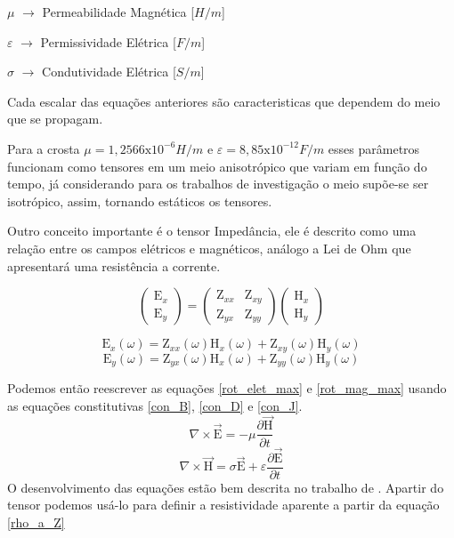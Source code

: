 	    $\mu$ $\rightarrow$ Permeabilidade Magnética [$H/m$]
	    
	    $\varepsilon$ $\rightarrow$ Permissividade Elétrica [$F/m$]
	    
	    $\sigma$ $\rightarrow$ Condutividade Elétrica [$S/m$]
	    
	    Cada escalar das equações anteriores são caracteristicas que dependem do meio 
	    que se propagam.
	    
	    Para a crosta $\mu = 1,2566\textrm{x}10^{-6} H/m$ e $\varepsilon = 8,85
	    \textrm{x}10^{-12} F/m$ esses parâmetros funcionam como tensores em um meio
	    anisotrópico que variam em função do tempo, já considerando para os 
	    trabalhos de investigação o meio supõe-se ser isotrópico, assim, 
	    tornando estáticos os tensores.
	    
	    Outro conceito importante é o tensor Impedância, ele é descrito como uma
	    relação entre os campos elétricos e magnéticos, análogo a Lei de Ohm \cite{eletromag8hayt}
	    que apresentará uma resistência a corrente.
	    
	    \begin{equation}
		\left (\begin{array}{c}
		 \textrm{E}_x\\
		 \textrm{E}_y
		\end{array}\right)
		=
		\left (\begin{array}{cc}
		 \textrm{Z}_{xx} & \textrm{Z}_{xy}\\
		 \textrm{Z}_{yx} & \textrm{Z}_{yy}
		\end{array}\right) \left (\begin{array}{c}
		 \textrm{H}_x\\
		 \textrm{H}_y
		\end{array}\right)
	    \end{equation}
	    
	    \begin{equation}
	     \textrm{E}_x (\omega)=\textrm{Z}_{xx}(\omega) \textrm{H}_{x}(\omega) + \textrm{Z}_{xy}(\omega) \textrm{H}_{y}(\omega)
	    \end{equation}
	    \begin{equation}
	     \textrm{E}_y (\omega)=\textrm{Z}_{yx}(\omega) \textrm{H}_{x}(\omega) + \textrm{Z}_{yy}(\omega) \textrm{H}_{y}(\omega)
	    \end{equation}  
	    
	    Podemos então reescrever as equações \ref{rot_elet_max}
	    e \ref{rot_mag_max} usando as equações constitutivas \ref{con_B}, \ref{con_D}
	    e \ref{con_J}.
	    \begin{equation}
	     \nabla \times \vec{\textrm{E}} = - \mu \frac{\partial \vec{\textrm{H}}}{\partial t} 
	    \end{equation}
	    \begin{equation}
	     \nabla \times \vec{\textrm{H}} = \sigma \vec{\textrm{E}} + \varepsilon \frac{\partial \vec{\textrm{E}}}{\partial t} 
	    \end{equation}
	    O desenvolvimento das equações estão bem descrita no trabalho de \citeauthor{didana2010}\citeyearpar{didana2010}.
	    Apartir do tensor podemos usá-lo para definir a resistividade aparente a partir da equação \ref{rho_a_Z}
	    
